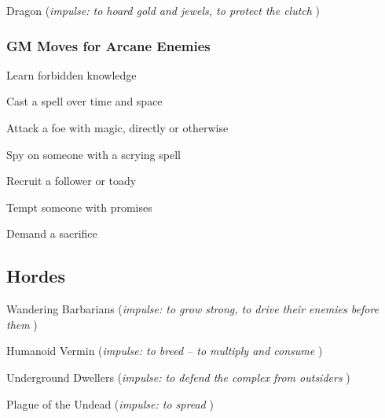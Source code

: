          
\item Dragon ({\em impulse: to hoard gold and jewels, to protect the clutch} )

       
\stopitemize
       
\subsubsection{GM Moves for Arcane Enemies}      
       
\startitemize[1,packed]
         
\item Learn forbidden knowledge

         
\item Cast a spell over time and space

         
\item Attack a foe with magic, directly or otherwise

         
\item Spy on someone with a scrying spell

         
\item Recruit a follower or toady

         
\item Tempt someone with promises

         
\item Demand a sacrifice

       
\stopitemize
       
\subsection{Hordes}   
       
\startitemize[1,packed]
         
\item Wandering Barbarians ({\em impulse: to grow strong, to drive their enemies before them} )

         
\item Humanoid Vermin ({\em impulse: to breed – to multiply and consume} )

         
\item Underground Dwellers ({\em impulse: to defend the complex from outsiders} )

         
\item Plague of the Undead ({\em impulse: to spread} )

